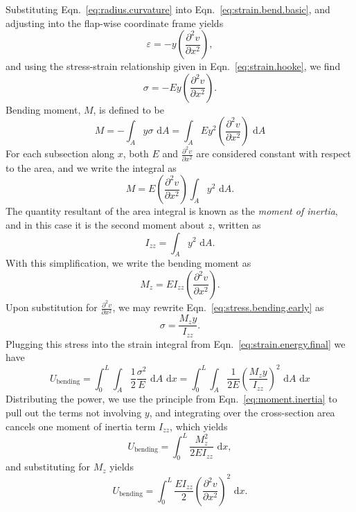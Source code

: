 Substituting Eqn.~\ref{eq:radius.curvature} into Eqn.~\ref{eq:strain.bend.basic}, and adjusting into the flap-wise coordinate frame yields
\begin{equation}
\varepsilon = -y\left(\frac{\partial^2v}{\partial x^2}\right),
\end{equation}
and using the stress-strain relationship given in Eqn.~\ref{eq:strain.hooke}, we find
\begin{equation}
\sigma = -Ey\left(\frac{\partial^2v}{\partial x^2}\right).
\label{eq:stress.bending.early}
\end{equation}
Bending moment, $M$, is defined to be 
\begin{equation}
M = -\int_Ay\sigma \text{ d}A = \int_AEy^2\left(\frac{\partial^2v}{\partial x^2}\right)\text{ d}A
\end{equation}
For each subsection along $x$, both $E$ and $\frac{\partial^2v}{\partial x^2}$ are considered constant with respect to the area, and we write the integral as
\begin{equation}
M = E\left(\frac{\partial^2v}{\partial x^2}\right)\int_Ay^2\text{ d}A.
\label{eq:moment.inertia}
\end{equation}
The quantity resultant of the area integral is known as the \emph{moment of inertia}, and in this case it is the second moment about $z$, written as
\begin{equation}
I_{zz} = \int_Ay^2\text{ d}A.
\end{equation}
With this simplification, we write the bending moment as
\begin{equation}
M_z = EI_{zz}\left(\frac{\partial^2v}{\partial x^2}\right).
\end{equation}
Upon substitution for $\frac{\partial^2v}{\partial x^2}$, we may rewrite Eqn.~\ref{eq:stress.bending.early} as
\begin{equation}
\sigma = \frac{M_zy}{I_{zz}}.
\label{eq:stress.bending.full}
\end{equation}
Plugging this stress into the strain integral from Eqn.~\ref{eq:strain.energy.final} we have
\begin{equation}
U_{\text{bending}} = \int_0^L\int_A\frac{1}{2}\frac{\sigma^2}{E}\text{ d}A\text{ d}x = \int_0^L\int_A\frac{1}{2E}\left(\frac{M_zy}{I_{zz}}\right)^2\text{ d}A\text{ d}x
\end{equation}
Distributing the power, we use the principle from Eqn.~\ref{eq:moment.inertia} to pull out the terms not involving $y$, and integrating over the cross-section area cancels one moment of inertia term $I_{zz}$, which yields
\begin{equation}
U_{\text{bending}} = \int_0^L\frac{M_z^2}{2EI_{zz}}\text{ d}x,
\end{equation}
and substituting for $M_z$ yields
\begin{equation}
U_{\text{bending}} = \int_0^L\frac{EI_{zz}}{2}\left(\frac{\partial^2 v}{\partial x^2}\right)^2\text{ d}x.
\label{eq:strain.bending.final}
\end{equation}

